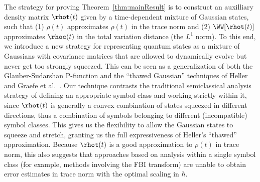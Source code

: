 \documentclass{article}
\numberwithin{equation}{section}
\begin{document}
The strategy for proving Theorem~\ref{thm:mainResult} is to construct an auxilliary density matrix $\rhot(t)$ given by a time-dependent mixture of Gaussian states,
such that (1) $\rho(t)$ approximates $\rho(t)$ in the trace norm and (2)  $\WW[\rhot(t)]$ approximates $\rhoc(t)$ in the total variation distance (the $L^1$ norm).  
To this end, we introduce a new strategy for representing quantum states as a mixture of Gaussians with covariance matrices that are allowed to dynamically evolve but never get too strongly squeezed. This can be seen as a generalization of both the Glauber-Sudarshan P-function \cite{glauber1963coherent, cahill1969density, sudarshan1963equivalence, agarwal1970calculus} and the ``thawed Gaussian'' techniques of Heller and Graefe et al.~\cite{heller1975time,heller1981frozen,graefe2018lindblad}.  Our technique contrasts the traditional semiclassical analysis strategy of defining an appropriate symbol class and working strictly within it, since $\rhot(t)$ is generally a convex combination of states squeezed in different directions, thus a combination of symbols belonging to different (incompatible) symbol classes.  This gives us the flexibility to allow the Gaussian states to squeeze and stretch, granting us the full expressiveness of Heller's ``thawed'' approximation.  
Because $\rhot(t)$ is a good approximation to $\rho(t)$ in trace norm, this also suggests that approaches based on analysis within a single symbol class (for example, methods involving the FBI transform) are unable to obtain error estimates in trace norm with the optimal scaling in $\hbar$.
\end{document}
